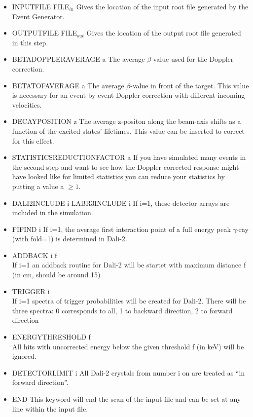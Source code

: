 \documentclass[12pt]{book}
\begin{document}
\FloatBarrier
\begin{itemize}
\item INPUTFILE FILE$_{in}$ \hfill{} \linebreak
  Gives the location of the input root file generated by the Event Generator.
\item OUTPUTFILE FILE$_{out}$ \hfill{} \linebreak
  Gives the location of the output root file generated in this step.
\item BETADOPPLERAVERAGE a \hfill{} \linebreak
  The average $\beta$-value used for the Doppler correction.
\item BETATOFAVERAGE a \hfill{} \linebreak
  The average $\beta$-value in front of the target. This value is necessary for an event-by-event
  Doppler correction with different incoming velocities.
\item DECAYPOSITION z\hfill{} \linebreak
  The average z-positon along the beam-axis shifts as a function of the excited states' lifetimes. This
  value can be inserted to correct for this effect.
\item STATISTICSREDUCTIONFACTOR a\hfill{} \linebreak
  If you have simulated many events in the second step and want to see how the Doppler corrected response might
  have looked like for limited statistics you can reduce your statistics by putting a value a $\ge 1$.
\item DALI2INCLUDE i\hfill{} \linebreak
  LABR3INCLUDE i\hfill{} \linebreak
  If i=1, these detector arrays are included in the simulation. 
\item FIFIND i\hfill{} \linebreak
  If i=1, the average first interaction point of a full energy peak $\gamma$-ray (with fold=1) is determined in Dali-2.
  
  
\item ADDBACK i f \\
	If i=1 an addback routine for Dali-2 will be startet with maximum distance f (in cm, should be around 15)
\item TRIGGER i\\
	If i=1 spectra of trigger probabilities will be created for Dali-2. There will be three spectra: 0 corresponds to all, 1 to backward direction, 2 to forward direction
\item ENERGYTHRESHOLD f\\
	All hits with uncorrected energy below the given threshold f (in keV) will be ignored.
\item DETECTORLIMIT i\hfill{} \linebreak
	All Dali-2 crystals from number i on are treated as ``in forward direction''.

\item END  \hfill{} \linebreak
  This keyword will end the scan of the input file and can be set at any line within the input file.
\end{itemize}
\end{document}
